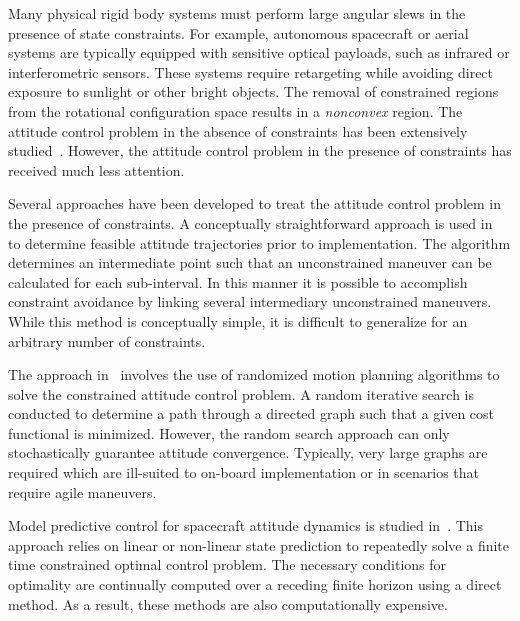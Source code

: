\documentclass[letterpaper, 10 pt, conference]{ieeeconf}  %
\begin{document}
Many physical rigid body systems must perform large angular slews in the presence of state constraints.
For example, autonomous spacecraft or aerial systems are typically equipped with sensitive optical payloads, such as infrared or interferometric sensors.
These systems require retargeting while avoiding direct exposure to sunlight or other bright objects.
The removal of constrained regions from the rotational configuration space results in a \textit{nonconvex} region.
The attitude control problem in the absence of constraints has been extensively studied~\cite{bullo2004,MayTeePaCC11,LEEITAC15}.
However, the attitude control problem in the presence of constraints has received much less attention.

Several approaches have been developed to treat the attitude control problem in the presence of constraints.
A conceptually straightforward approach is used in~\cite{hablani1999} to determine feasible attitude trajectories prior to implementation.
The algorithm determines an intermediate point such that an unconstrained maneuver can be calculated for each sub-interval.
In this manner it is possible to accomplish constraint avoidance by linking several intermediary unconstrained maneuvers.
While this method is conceptually simple, it is difficult to generalize for an arbitrary number of constraints.

The approach in~\cite{frazzoli2001} involves the use of randomized motion planning algorithms to solve the constrained attitude control problem.
A random iterative search is conducted to determine a path through a directed graph such that a given cost functional is minimized.
However, the random search approach can only stochastically guarantee attitude convergence.
Typically, very large graphs are required which are ill-suited to on-board implementation or in scenarios that require agile maneuvers.

Model predictive control for spacecraft attitude dynamics is studied in~\cite{guiggiani2014,kalabic2014,gupta2015}.
This approach relies on linear or non-linear state prediction to repeatedly solve a finite time constrained optimal control problem.
The necessary conditions for optimality are continually computed over a receding finite horizon using a direct method. 
As a result, these methods are also computationally expensive.
  
\end{document}
